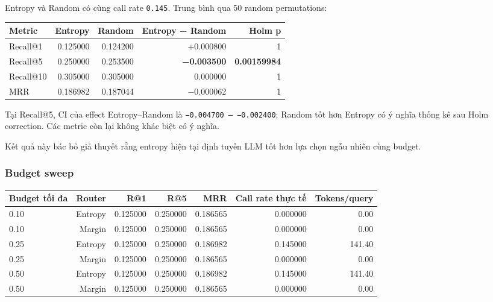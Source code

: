 Entropy và Random có cùng call rate \texttt{0.145}. Trung bình qua 50 random permutations:

\begin{table}[!htbp]
\centering
\scriptsize
\setlength{\tabcolsep}{2.5pt}
\begin{adjustbox}{max width=\textwidth}
\begin{tabular}{@{}lrrrr@{}}
\toprule
Metric & Entropy & Random & Entropy − Random & Holm p \\
\midrule
Recall@1 & 0.125000 & 0.124200 & +0.000800 & 1 \\
Recall@5 & 0.250000 & 0.253500 & \textbf{−0.003500} & \textbf{0.00159984} \\
Recall@10 & 0.305000 & 0.305000 & 0.000000 & 1 \\
MRR & 0.186982 & 0.187044 & −0.000062 & 1 \\
\bottomrule
\end{tabular}
\end{adjustbox}
\end{table}

Tại Recall@5, CI của effect Entropy--Random là \texttt{−0.004700 -- −0.002400}; Random tốt hơn Entropy có ý nghĩa thống kê sau Holm correction. Các metric còn lại không khác biệt có ý nghĩa.

Kết quả này bác bỏ giả thuyết rằng entropy hiện tại định tuyến LLM tốt hơn lựa chọn ngẫu nhiên cùng budget.

\subsubsection*{Budget sweep}

\begin{table}[!htbp]
\centering
\scriptsize
\setlength{\tabcolsep}{2.5pt}
\begin{adjustbox}{max width=\textwidth}
\begin{tabular}{@{}lrrrrrr@{}}
\toprule
Budget tối đa & Router & R@1 & R@5 & MRR & Call rate thực tế & Tokens/query \\
\midrule
0.10 & Entropy & 0.125000 & 0.250000 & 0.186565 & 0.000000 & 0.00 \\
0.10 & Margin & 0.125000 & 0.250000 & 0.186565 & 0.000000 & 0.00 \\
0.25 & Entropy & 0.125000 & 0.250000 & 0.186982 & 0.145000 & 141.40 \\
0.25 & Margin & 0.125000 & 0.250000 & 0.186565 & 0.000000 & 0.00 \\
0.50 & Entropy & 0.125000 & 0.250000 & 0.186982 & 0.145000 & 141.40 \\
0.50 & Margin & 0.125000 & 0.250000 & 0.186565 & 0.000000 & 0.00 \\
\bottomrule
\end{tabular}
\end{adjustbox}
\end{table}

